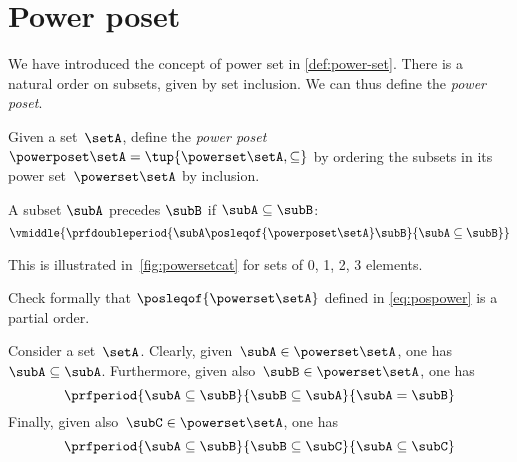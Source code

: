\section{Power poset}

We have introduced the concept of power set in \cref{def:power-set}.
There is a natural order on subsets, given by set inclusion.
We can thus define the \emph{power poset}.

\begin{definition}
    \label{def:power-poset}
    Given a set~$\setA$,
    define the \emph{power poset} $\powerposet\setA = \tup{\powerset\setA,\subseteq}$ by ordering the subsets in its power set~$\powerset\setA$ by inclusion.

    A subset $\subA$ precedes $\subB$ if $\subA \subseteq \subB$:
    \begin{equation}\label{eq:pospower}
        \vmiddle{
            \prfdoubleperiod{
                \subA \posleqof{\powerposet\setA} \subB
            }{
                \subA \subseteq \subB
            }
        }
    \end{equation}
\end{definition}
This is illustrated in~\cref{fig:powersetcat} for sets of 0, 1, 2, 3 elements.
\begin{exercise}
    Check formally that $\posleqof{\powerset\setA}$ defined in \cref{eq:pospower} is a partial order.
\end{exercise}
\begin{solution}
    Consider a set~$\setA$.
    Clearly, given~$\subA\in \powerset \setA$, one has~$\subA\subseteq \subA$.
    Furthermore, given also~$\subB\in \powerset \setA$, one has
    \begin{equation*}
        \prfperiod{\subA\subseteq \subB}{\subB\subseteq \subA}{\subA=\subB}
    \end{equation*}
    Finally, given also~$\subC\in \powerset \setA$, one has
    \begin{equation*}
        \prfperiod{\subA\subseteq \subB}{\subB\subseteq \subC}{\subA\subseteq\subC}
    \end{equation*}
\end{solution}
\vfill
\begin{figure*}[h]
    \centering
    \hfill
    \hfill
    \hfill
    \caption{Power set as a poset.
    }
    \label{fig:powersetcat}
\end{figure*}\
\vfill

